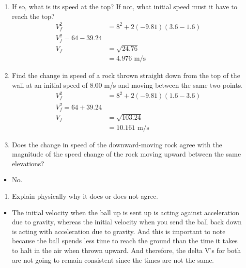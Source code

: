 \documentclass[
  letterpaper,
  DIV=11,
  numbers=noendperiod]{scrartcl}
\providecommand{\tightlist}{%
  \setlength{\itemsep}{0pt}\setlength{\parskip}{0pt}}\usepackage{longtable,booktabs,array}
\begin{document}
\begin{enumerate}
\def\labelenumi{(\alph{enumi})}
\setcounter{enumi}{1}
\item
  If so, what is its speed at the top? If not, what initial speed must
  it have to reach the top? \begin{align*}
    V_f^2 &= 8^2 + 2(-9.81)(3.6-1.6) \\
    V_f^2 = 64 - 39.24 \\
    V_f &= \sqrt{24.76} \\
    &= 4.976 \text{ m/s}
    \end{align*}
\item
  Find the change in speed of a rock thrown straight down from the top
  of the wall at an initial speed of \(8.00\) m/s and moving between the
  same two points. \begin{align*}
    V_f^2 &= 8^2 + 2(-9.81)(1.6-3.6) \\
    V_f^2 = 64 + 39.24 \\
    V_f &= \sqrt{103.24} \\
    &= 10.161 \text{ m/s}
    \end{align*}
\item
  Does the change in speed of the downward-moving rock agree with the
  magnitude of the speed change of the rock moving upward between the
  same elevations?
\end{enumerate}

\begin{itemize}
\tightlist
\item
  No.
\end{itemize}

\begin{enumerate}
\def\labelenumi{(\alph{enumi})}
\setcounter{enumi}{4}
\tightlist
\item
  Explain physically why it does or does not agree.
\end{enumerate}

\begin{itemize}
\tightlist
\item
  The initial velocity when the ball up is sent up is acting against
  acceleration due to gravity, whereas the initial velocity when you
  send the ball back down is acting with acceleration due to gravity.
  And this is important to note because the ball spends less time to
  reach the ground than the time it takes to halt in the air when thrown
  upward. And therefore, the delta V's for both are not going to remain
  consistent since the times are not the same.
\end{itemize}
\end{document}
